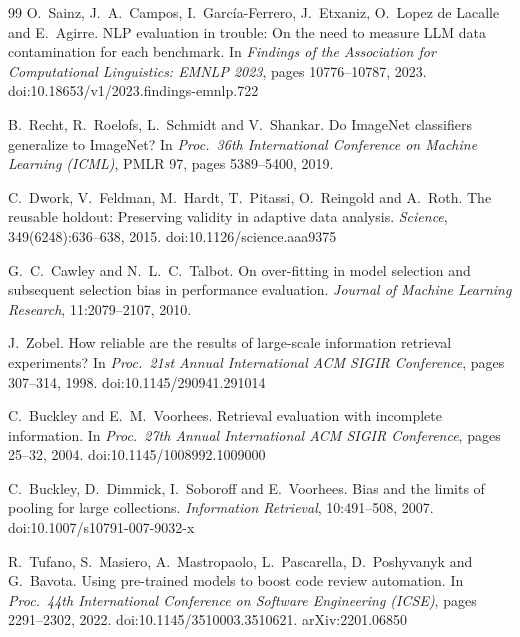 \documentclass[11pt,a4paper]{article}
\begin{document}
\begin{thebibliography}{99}
O.~Sainz, J.~A.~Campos, I.~Garc\'ia-Ferrero, J.~Etxaniz,
O.~Lopez de Lacalle and E.~Agirre.
\newblock NLP evaluation in trouble: On the need to measure LLM data
contamination for each benchmark.
\newblock In \emph{Findings of the Association for Computational
Linguistics: EMNLP 2023}, pages 10776--10787, 2023.
\newblock doi:10.18653/v1/2023.findings-emnlp.722

B.~Recht, R.~Roelofs, L.~Schmidt and V.~Shankar.
\newblock Do ImageNet classifiers generalize to ImageNet?
\newblock In \emph{Proc.\ 36th International Conference on Machine
Learning (ICML)}, PMLR 97, pages 5389--5400, 2019.

C.~Dwork, V.~Feldman, M.~Hardt, T.~Pitassi, O.~Reingold and A.~Roth.
\newblock The reusable holdout: Preserving validity in adaptive data
analysis.
\newblock \emph{Science}, 349(6248):636--638, 2015.
\newblock doi:10.1126/science.aaa9375

G.~C.~Cawley and N.~L.~C.~Talbot.
\newblock On over-fitting in model selection and subsequent selection bias
in performance evaluation.
\newblock \emph{Journal of Machine Learning Research}, 11:2079--2107, 2010.

J.~Zobel.
\newblock How reliable are the results of large-scale information
retrieval experiments?
\newblock In \emph{Proc.\ 21st Annual International ACM SIGIR
Conference}, pages 307--314, 1998.
\newblock doi:10.1145/290941.291014

C.~Buckley and E.~M.~Voorhees.
\newblock Retrieval evaluation with incomplete information.
\newblock In \emph{Proc.\ 27th Annual International ACM SIGIR
Conference}, pages 25--32, 2004.
\newblock doi:10.1145/1008992.1009000

C.~Buckley, D.~Dimmick, I.~Soboroff and E.~Voorhees.
\newblock Bias and the limits of pooling for large collections.
\newblock \emph{Information Retrieval}, 10:491--508, 2007.
\newblock doi:10.1007/s10791-007-9032-x


R.~Tufano, S.~Masiero, A.~Mastropaolo, L.~Pascarella, D.~Poshyvanyk and
G.~Bavota.
\newblock Using pre-trained models to boost code review automation.
\newblock In \emph{Proc.\ 44th International Conference on Software
Engineering (ICSE)}, pages 2291--2302, 2022.
\newblock doi:10.1145/3510003.3510621. arXiv:2201.06850


\end{thebibliography}
\end{document}
